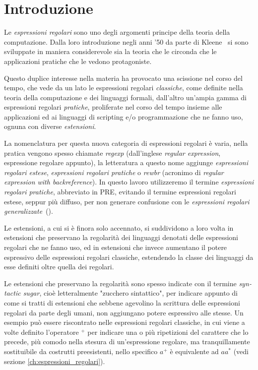 \chapter{Introduzione}
Le \textit{espressioni regolari} sono uno degli argomenti principe della teoria della computazione. Dalla loro introduzione negli anni '50 da parte di Kleene~\cite{kleene:regexp} si sono sviluppate in maniera considerevole sia la teoria che le circonda che le applicazioni pratiche che le vedono protagoniste.

Questo duplice interesse nella materia ha provocato una scissione nel corso del tempo, che vede da un lato le espressioni regolari \textit{classiche}, come definite nella teoria della computazione e dei linguaggi formali, dall'altro un'ampia gamma di espressioni regolari \textit{pratiche}, proliferate nel corso del tempo insieme alle applicazioni ed ai linguaggi di scripting e/o programmazione che ne fanno uso, ognuna con diverse \textit{estensioni}.

La nomenclatura per questa nuova categoria di espressioni regolari è varia, nella pratica vengono spesso chiamate \textit{regexp} (dall'inglese \foreignlanguage{english}{\textit{regular expression}}, espressione regolare appunto), la letteratura a questo nome aggiunge \textit{espressioni regolari estese}, \textit{espressioni regolari pratiche} o \textit{rewbr} (acronimo di \textit{regular expression with backreference}). In questo lavoro utilizzeremo il termine \textit{espressioni regolari pratiche}, abbreviato in PRE, evitando il termine espressioni regolari estese, seppur più diffuso, per non generare confusione con le \textit{espressioni regolari generalizzate}~(\cite[vedi][399]{sipser:intro}).

Le estensioni, a cui si è finora solo accennato, si suddividono a loro volta in estensioni che preservano la regolarità dei linguaggi denotati delle espressioni regolari che ne fanno uso, ed in estensioni che invece aumentano il potere espressivo delle espressioni regolari classiche, estendendo la classe dei linguaggi da esse definiti oltre quella dei regolari.

Le estensioni che preservano la regolarità sono spesso indicate con il termine \foreignlanguage{english}{\textit{syntactic sugar}}, cioè letteralmente "zucchero sintattico", per indicare appunto di come si tratti di estensioni che sebbene agevolino la scrittura delle espressioni regolari da parte degli umani, non aggiungano potere espressivo alle stesse. Un esempio può essere riscontrato nelle espressioni regolari classiche, in cui viene a volte definito l'operatore $^+$ per indicare una o più ripetizioni del carattere che lo precede, più comodo nella stesura di un'espressione regolare, ma tranquillamente sostituibile da costrutti preesistenti, nello specifico $a^+$ è equivalente ad $aa^*$ (vedi sezione \ref{ch:espressioni_regolari}).

